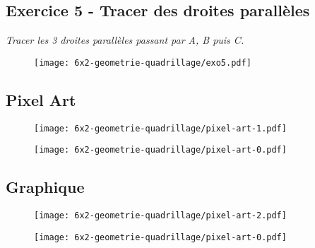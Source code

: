 \subsection*{Exercice 5 - Tracer des droites parallèles}

\textit{Tracer les 3 droites parallèles passant par A, B puis C.}

\begin{figure}[H]
  \centering
  \texttt{[image: 6x2-geometrie-quadrillage/exo5.pdf]}
\end{figure}

\subsection*{Pixel Art}


\begin{multicols}{2}
\begin{figure}[H]
  \centering
  \texttt{[image: 6x2-geometrie-quadrillage/pixel-art-1.pdf]}
\end{figure}

\begin{figure}[H]
  \centering
  \texttt{[image: 6x2-geometrie-quadrillage/pixel-art-0.pdf]}
\end{figure}
\end{multicols}

\subsection*{Graphique}


\begin{multicols}{2}
\begin{figure}[H]
  \centering
  \texttt{[image: 6x2-geometrie-quadrillage/pixel-art-2.pdf]}
\end{figure}

\begin{figure}[H]
  \centering
  \texttt{[image: 6x2-geometrie-quadrillage/pixel-art-0.pdf]}
\end{figure}
\end{multicols}
